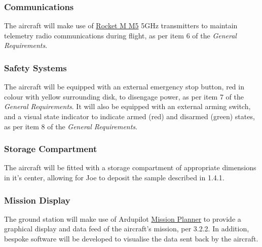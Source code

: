 \subsubsection*{Communications}
The aircraft will make use of \href{https://www.ubnt.com/airmax/rocketm/}{Rocket M M5}  5GHz transmitters to maintain telemetry radio communications during flight, as per item 6 of the \textit{General Requirements}.

\subsubsection*{Safety Systems}
The aircraft will be equipped with an external emergency stop button, red in colour with yellow surrounding disk, to disengage power, as per item 7 of the \textit{General Requirements}. It will also be equipped with an external arming switch, and a visual state indicator to indicate armed (red) and disarmed (green) states, as per item 8 of the \textit{General Requirements}.

\subsubsection*{Storage Compartment}
The aircraft will be fitted with a storage compartment of appropriate dimensions in it's center, allowing for Joe to deposit the sample described in 1.4.1.

\subsubsection*{Mission Display}
The ground station will make use of Ardupilot \href{http://planner.ardupilot.com/}{Mission Planner} to provide a graphical display and data feed of the aircraft's mission, per 3.2.2. In addition, bespoke software will be developed to visualise the data sent back by the aircraft.
